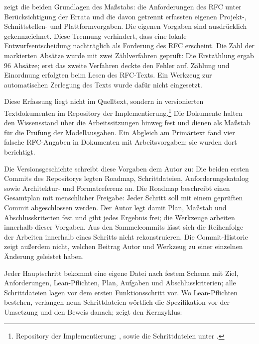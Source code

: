  zeigt die beiden Grundlagen des Maßstabs: die Anforderungen des RFC unter
Berücksichtigung der Errata und die davon getrennt erfassten eigenen Projekt-, Schnittstellen- und
Plattformvorgaben. Die eigenen Vorgaben sind ausdrücklich gekennzeichnet. Diese Trennung verhindert, dass
eine lokale Entwurfsentscheidung nachträglich als Forderung des RFC erscheint. Die Zahl der markierten
Absätze wurde mit zwei Zählverfahren geprüft: Die Erstzählung ergab 96 Absätze; erst das zweite Verfahren
deckte den Fehler auf. Zählung und Einordnung erfolgten beim Lesen des RFC-Texts. Ein Werkzeug zur
automatischen Zerlegung des Texts wurde dafür nicht eingesetzt.

Diese Erfassung liegt nicht im Quelltext, sondern in versionierten Textdokumenten im
Repository der Implementierung.\footnote{\raggedright Repository der Implementierung:
\mbox{},  sowie die Schrittdateien unter
.} Die Dokumente halten den Wissensstand über die Arbeitssitzungen hinweg fest und
dienen als Maßstab für die Prüfung der Modellausgaben. Ein Abgleich am Primärtext fand vier falsche
RFC-Angaben in Dokumenten mit Arbeitsvorgaben; sie wurden dort berichtigt.

Die Versionsgeschichte schreibt diese Vorgaben dem Autor zu: Die beiden ersten Commits des Repositorys
legten Roadmap, Schrittdateien, Anforderungskatalog sowie Architektur- und Formatreferenz an. Die Roadmap
beschreibt einen Gesamtplan mit menschlicher Freigabe: Jeder Schritt soll mit einem geprüften Commit
abgeschlossen werden. Der Autor legt damit Plan, Maßstab und Abschlusskriterien fest und gibt jedes
Ergebnis frei; die Werkzeuge arbeiten innerhalb dieser Vorgaben. Aus den Sammelcommits lässt sich die
Reihenfolge der Arbeiten innerhalb eines Schritts nicht rekonstruieren. Die Commit-Historie zeigt außerdem
nicht, welchen Beitrag Autor und Werkzeug zu einer einzelnen Änderung geleistet haben.

Jeder Hauptschritt bekommt eine eigene Datei nach festem Schema mit Ziel,
Anforderungen, Lean-Pflichten, Plan, Aufgaben und Abschlusskriterien; alle Schrittdateien lagen vor dem
ersten Funktionsschritt vor. Wo Lean-Pflichten bestehen, verlangen neun Schrittdateien wörtlich die
Spezifikation vor der Umsetzung und den Beweis danach;  zeigt den Kernzyklus:

